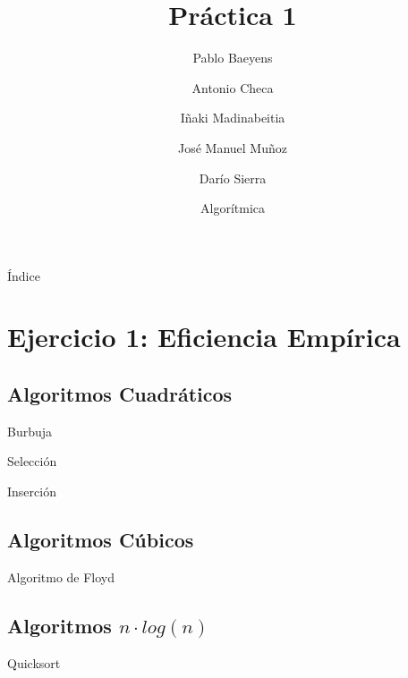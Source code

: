 \documentclass[10pt,compress,usetitleprogressbar,mathserif]{beamer}
\title{Práctica 1}
\author{Pablo Baeyens \and Antonio Checa \and Iñaki Madinabeitia \and José Manuel Muñoz \and Darío Sierra}
\date{Algorítmica}
\begin{document}
\maketitle

\begin{frame}{Índice}
  \tableofcontents
\end{frame}

\section{Ejercicio 1: \large{Eficiencia Empírica }}

\subsection{Algoritmos Cuadráticos}

\begin{frame}{Burbuja}
	\resizebox{\linewidth}{!}{
		\hspace{1cm}
		
	}
\end{frame}

\begin{frame}{Selección}
	\resizebox{\linewidth}{!}{
		\hspace{1cm}
		
	}

\end{frame}

\begin{frame}{Inserción}
	\resizebox{\linewidth}{!}{
		\hspace{1cm}
		
	}
\end{frame}

\subsection{Algoritmos Cúbicos}

\begin{frame}{Algoritmo de Floyd}
	\resizebox{\linewidth}{!}{
		\hspace{1cm}
		
	}
\end{frame}

\subsection{Algoritmos $n\cdot log(n)$ }

\begin{frame}{Quicksort}
	\resizebox{\linewidth}{!}{
		\hspace{1cm}
		
	}
\end{frame}
\end{document}
